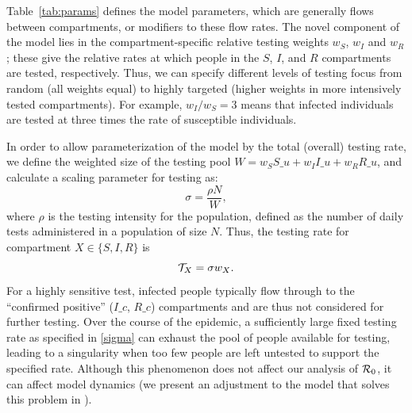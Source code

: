 Table~\ref{tab:params} defines the model parameters, which are generally \percap flows between compartments, or modifiers to these flow rates. The novel component of the model lies in the compartment-specific relative testing weights $w_S$, $w_I$ and $w_R$; these give the relative rates at which people in the $S$, $I$, and $R$ compartments are tested, respectively. Thus, we can specify different levels of testing focus from random (all weights equal) to highly targeted (higher weights in more intensively tested compartments). For example, $w_I/w_S=3$ means that infected individuals are tested at three times the \percap rate of susceptible individuals. 

In order to allow parameterization of the model by the total (overall) \percap testing rate, we define the weighted size of the testing pool $W = w_S S\_u + w_I I\_u + w_R R\_u$, and calculate a scaling parameter for testing as:
\begin{equation}
\label{sigma}
\sigma = \frac{\rho N}{W},
\end{equation}
where $\rho$ is the \percap testing intensity for the population, defined as the number of daily tests administered in a population of size $N$.
Thus, the \percap testing rate for compartment $X \in \{S,I,R\}$ is 
\begin{equation}
\label{test}
\testing{X}=\sigma w_X.
\end{equation}
For a highly sensitive test, infected people typically flow through to the ``confirmed positive'' ($I\_c$, $R\_c$) compartments and are thus not considered for further testing. Over the course of the epidemic, a sufficiently large fixed testing rate as specified in \eqref{sigma} can exhaust the pool of people available for testing, leading to a singularity when too few people are left untested to support the specified rate. Although this phenomenon does not affect our analysis of $\mathcal{R}_0$, it can affect model dynamics (we present an adjustment to the model that solves this problem in ).

